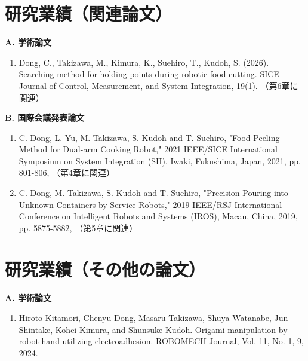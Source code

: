 \chapter*{研究業績（関連論文）}

\noindent\textbf{A. 学術論文}

\begin{enumerate}[
  label=\arabic*).,
  leftmargin=3em,
  itemsep=0.8\baselineskip
]
  \item Dong, C., Takizawa, M., Kimura, K., Suehiro, T., Kudoh, S. (2026). Searching method for holding points during robotic food cutting. SICE Journal of Control, Measurement, and System Integration, 19(1). 
  （第6章に関連）
\end{enumerate}

\vspace{1\baselineskip}
\noindent\textbf{B. 国際会議発表論文}

\begin{enumerate}[
  label=\arabic*).,
  leftmargin=3em,
  itemsep=0.8\baselineskip,
  resume
]
  \item C. Dong, L. Yu, M. Takizawa, S. Kudoh and T. Suehiro, "Food Peeling Method for Dual-arm Cooking Robot," 2021 IEEE/SICE International Symposium on System Integration (SII), Iwaki, Fukushima, Japan, 2021, pp. 801-806,
  （第4章に関連）

  \item C. Dong, M. Takizawa, S. Kudoh and T. Suehiro, "Precision Pouring into Unknown Containers by Service Robots," 2019 IEEE/RSJ International Conference on Intelligent Robots and Systems (IROS), Macau, China, 2019, pp. 5875-5882,
  （第5章に関連）
\end{enumerate}




\chapter*{研究業績（その他の論文）}
\vspace{1\baselineskip}

\noindent\textbf{A. 学術論文}

\begin{enumerate}[
  label=\arabic*).,
  leftmargin=3em,
  itemsep=0.8\baselineskip
]
  \item Hiroto Kitamori, Chenyu Dong, Masaru Takizawa, Shuya Watanabe, Jun Shintake, Kohei Kimura, and Shunsuke Kudoh. Origami manipulation by robot hand utilizing electroadhesion. ROBOMECH Journal, Vol. 11, No. 1, 9, 2024.
\end{enumerate}



